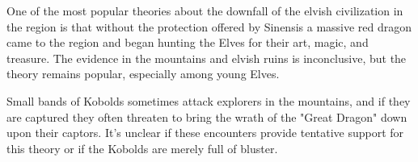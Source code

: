 One of the most popular theories about the downfall of the elvish civilization in the region is that without the protection offered by Sinensis a massive red dragon came to the region and began hunting the Elves for their art, magic, and treasure.
The evidence in the mountains and elvish ruins is inconclusive, but the theory remains popular, especially among young Elves.

Small bands of Kobolds sometimes attack explorers in the mountains, and if they are captured they often threaten to bring the wrath of the "Great Dragon" down upon their captors.
It's unclear if these encounters provide tentative support for this theory or if the Kobolds are merely full of bluster.
